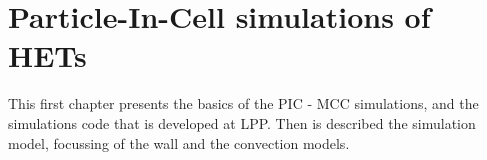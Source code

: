 
\chapter{Particle-In-Cell simulations of HETs}
\label{ch-1}

% 
% 
% 


This first chapter presents the basics of the \ac{PIC} - \ac{MCC} simulations, and the simulations code \LPPic that is developed at \ac{LPP}.
Then is described the simulation model, focussing of the wall and the convection models.

\minitoc


 











